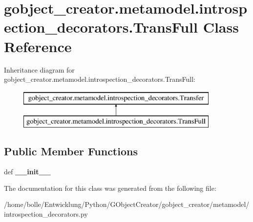 \hypertarget{classgobject__creator_1_1metamodel_1_1introspection__decorators_1_1TransFull}{
\section{gobject\_\-creator.metamodel.introspection\_\-decorators.TransFull Class Reference}
\label{classgobject__creator_1_1metamodel_1_1introspection__decorators_1_1TransFull}
}
Inheritance diagram for gobject\_\-creator.metamodel.introspection\_\-decorators.TransFull:\begin{figure}[H]
\begin{center}
\leavevmode
\includegraphics[height=2cm]{classgobject__creator_1_1metamodel_1_1introspection__decorators_1_1TransFull}
\end{center}
\end{figure}
\subsection*{Public Member Functions}
\begin{DoxyCompactItemize}
\item 
\hypertarget{classgobject__creator_1_1metamodel_1_1introspection__decorators_1_1TransFull_a92891e3ce0d2d82cbadb759bb724d811}{
def {\bfseries \_\-\_\-init\_\-\_\-}}
\label{classgobject__creator_1_1metamodel_1_1introspection__decorators_1_1TransFull_a92891e3ce0d2d82cbadb759bb724d811}

\end{DoxyCompactItemize}


The documentation for this class was generated from the following file:\begin{DoxyCompactItemize}
\item 
/home/bolle/Entwicklung/Python/GObjectCreator/gobject\_\-creator/metamodel/introspection\_\-decorators.py\end{DoxyCompactItemize}
